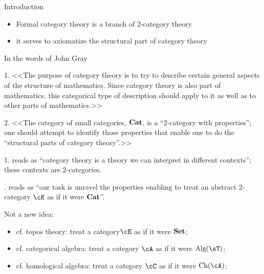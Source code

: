 \documentclass{beamer}
\begin{document}
\begin{frame}
	\centering\Huge Introduction
\end{frame}
\begin{frame}
	\begin{itemize}
		\item Formal category theory is a branch of 2-category theory
		\item it serves to axiomatize the \alert{structural part} of category theory
	\end{itemize}
	In the words of John Gray
	\begin{block}{1.}
		<<The purpose of category theory is to try to describe certain general
		aspects of the structure of mathematics. Since category theory
		is also part of mathematics, this categorical type of description
		should apply to it as well as to other parts of mathematics.>>
	\end{block}
	\begin{block}{2.}
		<<The category of small categories, $\mathbf{Cat}$, is a ``2-category with properties''; one should attempt to identify those properties that enable one to do the ``structural parts of category theory''.>>
	\end{block}
\end{frame}

\begin{frame}
	1. reads as ``category \alert{theory} is a \alert{theory} we can interpret in different contexts''; these contexts are 2-categories.\onslide<2->

	. reads as ``our task is unravel the properties enabling to treat an abstract 2-category $\cK$ as if it were $\mathbf{Cat}$''.

	\vspace*{1cm}
	Not a new idea:
	\begin{itemize}
		\item cf. \alert{topos theory}: treat  a category$\cE$ as if it were $\mathbf{Set}$;
		\item cf. \alert{categorical algebra}: treat a category $\cA$ as if it were $\text{Alg}(\sT)$;
		\item cf. \alert{homological algebra}: treat a category $\cC$ as if it were $\text{Ch}(\cA)$;
	\end{itemize}
\end{frame}
\end{document}
